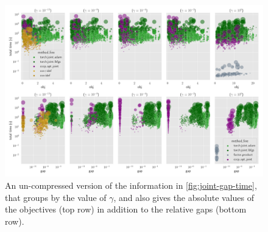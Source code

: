 \begin{subappendices}
\begin{figure}
    \includegraphics[height=0.45\textheight]{figs/rand-joint/gap-vs-time-by-gamma}
    \caption[A disaggregated version of \cref*{fig:joint-gap-time}]{\small
        An un-compressed version of the information in \cref{fig:joint-gap-time}, that groups by the value of $\gamma$, and also gives the absolute values of the objectives (top row) in addition to the relative gaps (bottom row).
    }\label{fig:joint-gap-vs-time-by-gamma}
\end{figure}







\end{subappendices}
